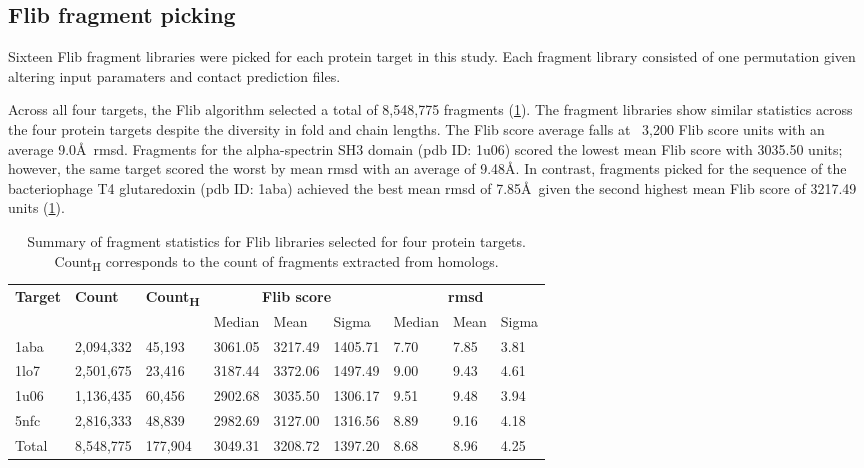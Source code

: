 \subsection{Flib fragment picking}

Sixteen Flib fragment libraries were picked for each protein target in this study. Each fragment library consisted of one permutation given altering input paramaters and contact prediction files.

Across all four targets, the Flib algorithm selected a total of 8,548,775 fragments (\cref{table:ample_flib_frag_summary}). The fragment libraries show similar statistics across the four protein targets despite the diversity in fold and chain lengths. The Flib score average falls at ~3,200 Flib score units with an average 9.0\AA\ \gls{rmsd}. Fragments for the alpha-spectrin SH3 domain (\gls{pdb} ID: 1u06) scored the lowest mean Flib score with 3035.50 units; however, the same target scored the worst by mean \gls{rmsd} with an average of 9.48\AA. In contrast, fragments picked for the sequence of the bacteriophage T4 glutaredoxin (\gls{pdb} ID: 1aba) achieved the best mean \gls{rmsd} of 7.85\AA\ given the second highest mean Flib score of 3217.49 units (\cref{table:ample_flib_frag_summary}).

\begin{table}[H]
  \centering
  \scriptsize
  \caption[Flib fragment characterics across four protein targets]{Summary of fragment statistics for Flib libraries selected for four protein targets. Count\textsubscript{H} corresponds to the count of fragments extracted from homologs.}
  \label{table:ample_flib_frag_summary}
  \begin{tabularx}{\textwidth}{X X X X X X X X X}
      \hline
      \multirow{2}{*}{\textbf{Target}} & \multirow{2}{*}{\textbf{Count}} & \multirow{2}{*}{\textbf{Count\textsubscript{H}}} & \multicolumn{3}{c}{\textbf{Flib score}} & \multicolumn{3}{c}{\textbf{\gls{rmsd}}} \\ \cline{4-9}
      		&			&			& Median 	& Mean 		& Sigma 	& Median 	& Mean 	& Sigma \\
      
      \hline
	  1aba	& 2,094,332	& 45,193	& 3061.05	& 3217.49	& 1405.71	& 7.70		& 7.85	& 3.81	\\
  	  1lo7  & 2,501,675	& 23,416	& 3187.44	& 3372.06	& 1497.49	& 9.00		& 9.43	& 4.61  \\
      1u06  & 1,136,435	& 60,456	& 2902.68	& 3035.50	& 1306.17	& 9.51		& 9.48	& 3.94	\\
      5nfc  & 2,816,333	& 48,839	& 2982.69	& 3127.00	& 1316.56	& 8.89		& 9.16	& 4.18	\\ 
      \hline
      Total	& 8,548,775	& 177,904	& 3049.31	& 3208.72	& 1397.20	& 8.68		& 8.96	& 4.25	\\ 
      \hline
  \end{tabularx}
\end{table}

